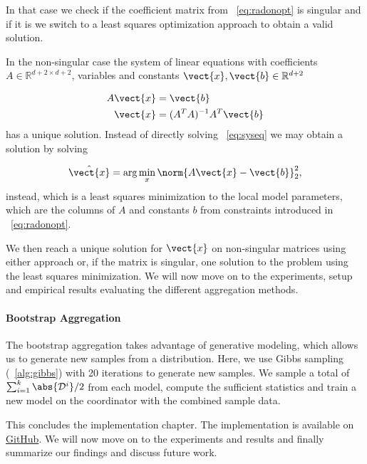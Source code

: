 In that case we check if the coefficient matrix from \eq~\ref{eq:radonopt} is singular and if it is we switch to a least squares optimization approach to obtain a valid solution. 

In the non-singular case the system of linear equations with coefficients $A \in \mathbb{R}^{d+2 \times d+2}$, variables and constants $\vect{x}, \vect{b} \in \mathbb{R}^{d+2}$

\begin{equation}
    \label{eq:syseq}
    \begin{split}
        A\vect{x} &= \vect{b} \\
        \vect{x} &= (A^TA)^{-1}A^T \vect{b}
    \end{split}
\end{equation}
has a unique solution.
Instead of directly solving \eq~\ref{eq:syseq} we may obtain a solution by solving

\begin{equation}
    \hat{\vect{x}} = \arg\min_{x} \norm{A\vect{x} - \vect{b}}^2_2,
\end{equation}
instead, which is a least squares minimization \wrt to the local model parameters, which are the columns of $A$ and constants $b$ from constraints introduced in \eq~\ref{eq:radonopt}.

We then reach a unique solution for $\vect{x}$ on non-singular matrices using either approach or, if the matrix is singular, one solution to the problem using the least squares minimization.
We will now move on to the experiments, setup and empirical results evaluating the different aggregation methods.

\paragraph*{Bootstrap Aggregation}

The bootstrap aggregation takes advantage of generative modeling, which allows us to generate new samples from a distribution.
Here, we use Gibbs sampling (\alg~\ref{alg:gibbs}) with 20 iterations to generate new samples.
We sample a total of $\sum_{i=1}^k \abs{\mathcal{D}^i} /2$ from each model, compute the sufficient statistics and train a new model on the coordinator with the combined sample data.

This concludes the implementation chapter.
The implementation is available on \href{https://github.com/Xst4r/Distributed-PGM/tree/master/Code}{GitHub}.
We will now move on to the experiments and results and finally summarize our findings and discuss future work.